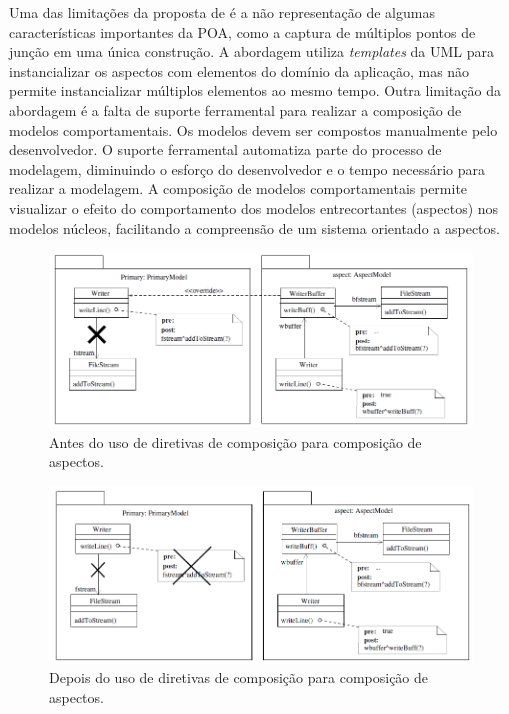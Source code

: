 Uma das limitações da proposta de \cite{france:06} é a não representação de algumas características importantes da POA, como a captura de múltiplos
pontos de junção em uma única construção. A abordagem utiliza \textit{templates} da UML para instancializar os aspectos com elementos do domínio da
aplicação, mas não permite instancializar múltiplos elementos ao mesmo tempo. Outra limitação da abordagem é a falta de suporte ferramental para
realizar a composição de modelos comportamentais. Os modelos devem ser compostos manualmente pelo desenvolvedor. O suporte ferramental automatiza
parte do processo de modelagem, diminuindo o esforço do desenvolvedor e o tempo necessário para realizar a modelagem. A composição de modelos
comportamentais permite visualizar o efeito do comportamento dos modelos entrecortantes (aspectos) nos modelos núcleos, facilitando a compreensão de
um sistema orientado a aspectos.

\begin{landscape}
\begin{figure}
	\centering
	\includegraphics{img/clarke_1.png}
	\caption{Antes do uso de diretivas de composição para composição de aspectos.}\label{fig:clarke_1}
\end{figure}
\end{landscape}

\begin{landscape}
\begin{figure}
	\centering
	\includegraphics{img/clarke_2.png}
	\caption{Depois do uso de diretivas de composição para composição de aspectos.}\label{fig:clarke_2}
\end{figure}
\end{landscape}

